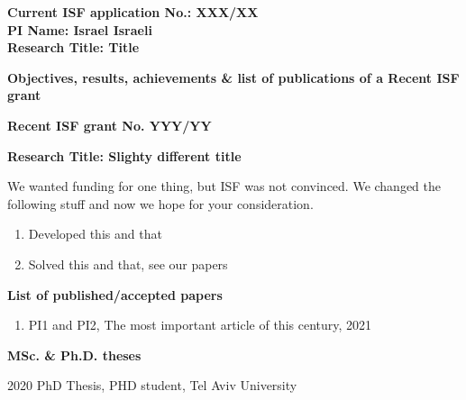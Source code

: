 \documentclass[11pt,a4paper]{article}
\begin{document}
\textbf{Current ISF application No.: XXX/XX \\
PI Name: Israel Israeli \\
Research Title: Title }

\bigskip

\begin{center}
    \textbf{\Large{Objectives, results, achievements \& list of publications of a Recent ISF grant}}
\end{center}

\textbf{Recent ISF grant No. YYY/YY}

\textbf{Research Title: Slighty different title}

\bigskip

We wanted funding for one thing, but ISF was not convinced. We changed the following stuff and now we hope for your consideration. 

\begin{enumerate}

\item Developed this and that 

\item Solved this and that, see our papers
 
\end{enumerate}


\textbf{List of published/accepted papers}

\begin{enumerate}

\item PI1 and PI2, The most important article of this century, 2021

\end{enumerate}



\textbf{MSc. \& Ph.D. theses}

2020  PhD Thesis, PHD student, Tel Aviv University 

%
%
\end{document}

